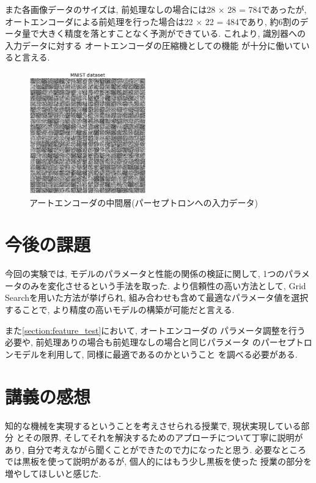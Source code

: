 \documentclass[10pt,a4paper,twocolumn]{jarticle}
\begin{document}
また各画像データのサイズは, 前処理なしの場合には28 × 28 = 784であったが, 
オートエンコーダによる前処理を行った場合は22 × 22 = 484であり, 
約6割のデータ量で大きく精度を落とすことなく予測ができている. 
これより, 識別器への入力データに対する
オートエンコーダの圧縮機としての機能\cite{autoencoder}
が十分に働いていると言える. 

\begin{figure}[htbp]
  \centering
  \includegraphics[width=0.45\textwidth]{assets/img/tiled_autoencoder_hidden_mnist.eps}
  \caption{アートエンコーダの中間層(パーセプトロンへの入力データ)}
  \label{fig:autoencoder-hidden}
\end{figure}

\section{今後の課題}
今回の実験では, モデルのパラメータと性能の関係の検証に関して, 
1つのパラメータのみを変化させるという手法を取った. 
より信頼性の高い方法として, Grid Searchを用いた方法が挙げられ, 
組み合わせも含めて最適なパラメータ値を選択することで, 
より精度の高いモデルの構築が可能だと言える. 

また\ref{section:feature_test}において, オートエンコーダの
パラメータ調整を行う必要や,
前処理ありの場合も前処理なしの場合と同じパラメータ
のパーセプトロンモデルを利用して, 同様に最適であるのかということ
を調べる必要がある. 

\section{講義の感想}
知的な機械を実現するということを考えさせられる授業で, 現状実現している部分
とその限界, そしてそれを解決するためのアプローチについて丁寧に説明が
あり, 自分で考えながら聞くことができたので力になったと思う. 
必要なところでは黒板を使って説明があるが, 個人的にはもう少し黒板を使った
授業の部分を増やしてほしいと感じた. 
\end{document}
